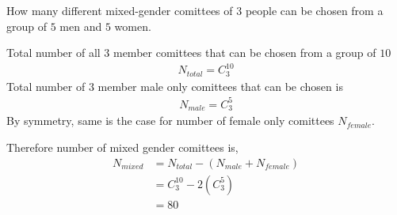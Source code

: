 
%
%
%
%
% 
% 

\question How many different mixed-gender comittees of 3 people can be chosen from a group of $5$ men and $5$ women.

\insertQR{}

\ifprintanswers
\fi 

\begin{solution}
  Total number of all $3$ member comittees that can be chosen from a group of $10$
  \begin{align}
    N_{total} = C^{10}_3 \nonumber
  \end{align}
  Total number of $3$ member male only comittees that can be chosen is
  \begin{align}
    N_{male} = C^{5}_3 \nonumber
  \end{align}
  By symmetry, same is the case for number of female only comittees $N_{female}$.
  
  Therefore number of mixed gender comittees is,
  \begin{align}
    N_{mixed} &= N_{total} - (N_{male}+N_{female}) \nonumber \\
              &= C^{10}_3 - 2(C^5_3) \nonumber \\
              &= 80 \nonumber
  \end{align}
\end{solution}


